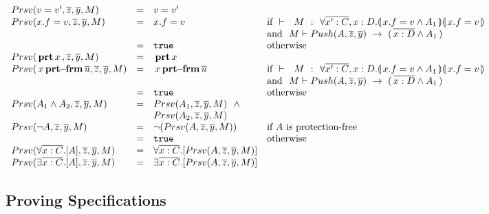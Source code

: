 {\small{
$\begin{array}{lcll}
\\
\\
\preserve {v=v'} {\overline z} {\overline y} M  & = &  v=v' 
\\
\preserve {x.f=v} {\overline z} {\overline y} M & = & x.f=v  & \mbox{if} \ \ \promises M   {\TwoStatesQ {\overline {x':C},x:D} {x.f = v \wedge A_1}{x.f=v}} 
\\ 
& & & \mbox{and} \ \ M \vdash {\push A  {\overline {z}}  {\overline y}} \  \rightarrow \ (\, {\overline {x:D}} \wedge A_1\, )
\\
   & = &   \prg{true} & \mbox{otherwise}
   \\
\preserve  { \inside x}  {\overline z} {\overline y}  M & = &   \inside x 
\\
\preserve  { \protectedFrom x {\overline {u}} }  {\overline z} {\overline y} M  & = &   { \protectedFrom x {\overline {u}} }  & \mbox{if} \ \ \promises M   {\TwoStatesQ {\overline {x':C},x:D} {x.f = v \wedge A_1}{x.f=v}} 
\\ 
& & & \mbox{and} \ \ M \vdash {\push A  {\overline {z}}  {\overline y}} \  \rightarrow \ (\, {\overline {x:D}} \wedge A_1\, )
\\
   & = &   \prg{true} & \mbox{otherwise}

\\
\preserve  {A_1 \wedge A_2} {\overline z} {\overline y}  M & = & \preserve { A_1}  {\overline z} {\overline y}  M \ \ \wedge \\
& &  \preserve { A_2}  {\overline z} {\overline y}  M
\\
\preserve  {\neg A}{\overline z} {\overline y}  M   & = & \neg (\preserve {A} {\overline z} {\overline y}  M)& \mbox{if  $A$ is protection-free}
\\
  & = &  \prg{true} & \mbox{otherwise}
\\
\preserve {\forall \overline{x:C}.[ A ]} {\overline z} {\overline y}  M   & = & \forall \overline{x:C}.[ \preserve A  {\overline z} {\overline y}  M ] & 
\\
\preserve {\exists \overline{x:C}.[ A ]} {\overline z} {\overline y}  M   & = & \exists \overline{x:C}.[ \preserve A {\overline z} {\overline y}  M  ] & 
\end{array}
$
}}

\subsection{Proving \SpecLang Specifications}

